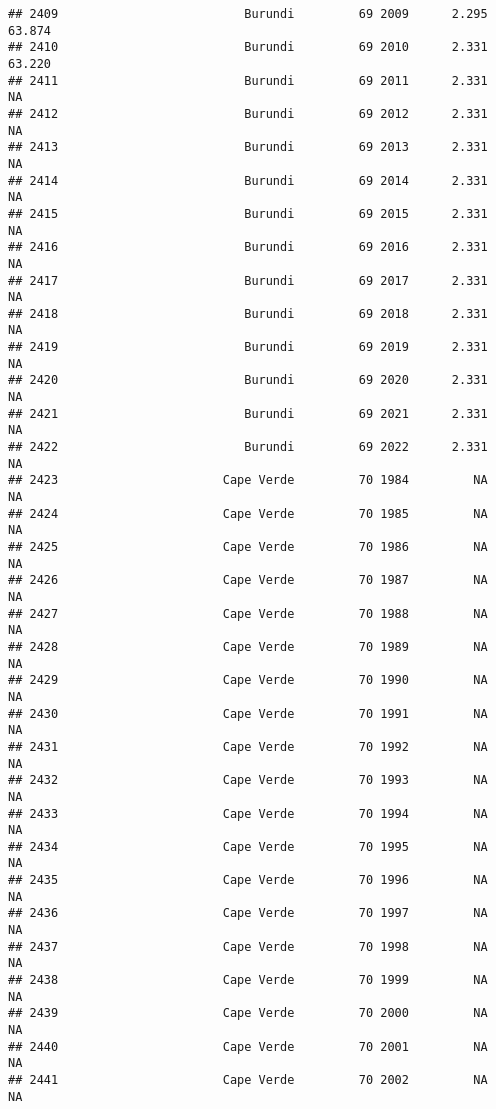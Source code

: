 \documentclass[
]{article}
\begin{document}
\begin{verbatim}
## 2409                          Burundi         69 2009      2.295     63.874
## 2410                          Burundi         69 2010      2.331     63.220
## 2411                          Burundi         69 2011      2.331         NA
## 2412                          Burundi         69 2012      2.331         NA
## 2413                          Burundi         69 2013      2.331         NA
## 2414                          Burundi         69 2014      2.331         NA
## 2415                          Burundi         69 2015      2.331         NA
## 2416                          Burundi         69 2016      2.331         NA
## 2417                          Burundi         69 2017      2.331         NA
## 2418                          Burundi         69 2018      2.331         NA
## 2419                          Burundi         69 2019      2.331         NA
## 2420                          Burundi         69 2020      2.331         NA
## 2421                          Burundi         69 2021      2.331         NA
## 2422                          Burundi         69 2022      2.331         NA
## 2423                       Cape Verde         70 1984         NA         NA
## 2424                       Cape Verde         70 1985         NA         NA
## 2425                       Cape Verde         70 1986         NA         NA
## 2426                       Cape Verde         70 1987         NA         NA
## 2427                       Cape Verde         70 1988         NA         NA
## 2428                       Cape Verde         70 1989         NA         NA
## 2429                       Cape Verde         70 1990         NA         NA
## 2430                       Cape Verde         70 1991         NA         NA
## 2431                       Cape Verde         70 1992         NA         NA
## 2432                       Cape Verde         70 1993         NA         NA
## 2433                       Cape Verde         70 1994         NA         NA
## 2434                       Cape Verde         70 1995         NA         NA
## 2435                       Cape Verde         70 1996         NA         NA
## 2436                       Cape Verde         70 1997         NA         NA
## 2437                       Cape Verde         70 1998         NA         NA
## 2438                       Cape Verde         70 1999         NA         NA
## 2439                       Cape Verde         70 2000         NA         NA
## 2440                       Cape Verde         70 2001         NA         NA
## 2441                       Cape Verde         70 2002         NA         NA

\end{verbatim}
\end{document}
